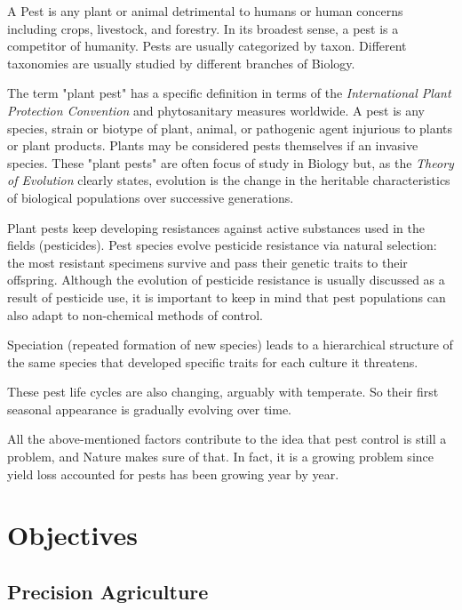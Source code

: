 A Pest is any plant or animal detrimental to humans or human concerns including crops, livestock, and forestry. In its broadest sense, a pest is a competitor of humanity. Pests are usually categorized by taxon. Different taxonomies are usually studied by different branches of Biology. 

The term "plant pest" has a specific definition in terms of the \textit{International Plant Protection Convention} and phytosanitary measures worldwide. A pest is any species, strain or biotype of plant, animal, or pathogenic agent injurious to plants or plant products. Plants may be considered pests themselves if an invasive species. These "plant pests" are often focus of study in Biology but, as the \textit{Theory of Evolution} clearly states, evolution is the change in the heritable characteristics of biological populations over successive generations. 

Plant pests keep developing resistances against active substances used in the fields (pesticides). Pest species evolve pesticide resistance via natural selection: the most resistant specimens survive and pass their genetic traits to their offspring. Although the evolution of pesticide resistance is usually discussed as a result of pesticide use, it is important to keep in mind that pest populations can also adapt to non-chemical methods of control.

Speciation (repeated formation of new species) leads to a hierarchical structure of the same species that developed specific traits for each culture it threatens. 

These pest life cycles are also changing, arguably with temperate. So their first seasonal appearance is gradually evolving over time.

All the above-mentioned factors contribute to the idea that pest control is still a problem, and Nature makes sure of that. In fact, it is a growing problem since yield loss accounted for pests has been growing year by year.

\section{Objectives} %
\label{sec:objective}

\subsection{Precision Agriculture}
\label{sec:precision_agriculture}


